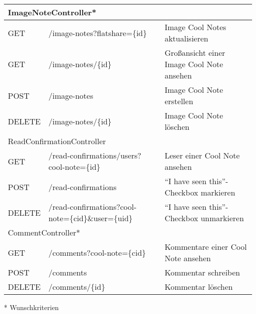 \documentclass[a4paper]{scrreprt}
\begin{document}
\begin{flushleft}
\begin{longtable}{|p{}|p{}|p{}|}
		\hline
		\multicolumn{3}{|l|}{ImageNoteController*} \\
		\hline
		GET & /image-notes?flatshare=\{id\} & Image Cool Notes aktualisieren \\
		GET & /image-notes/\{id\} & Großansicht einer Image Cool Note ansehen \\
		POST & /image-notes & Image Cool Note erstellen \\
		DELETE & /image-notes/\{id\} & Image Cool Note löschen \\
		\hline	
		\multicolumn{3}{|l|}{ReadConfirmationController} \\
		\hline
		GET & /read-confirmations/users?cool-note=\{id\} & Leser einer Cool Note ansehen \\
		POST & /read-confirmations & ``I have seen this''-Checkbox markieren \\
		DELETE & /read-confirmations?cool-note=\{cid\}\&user=\{uid\} & ``I have seen this''-Checkbox unmarkieren \\
		\hline
		\multicolumn{3}{|l|}{CommentController*} \\
		\hline
		GET & /comments?cool-note=\{cid\} & Kommentare einer Cool Note ansehen \\
		POST & /comments & Kommentar schreiben \\
		DELETE & /comments/\{id\} & Kommentar löschen \\
		\hline
		\end{longtable}
	\end{flushleft}
	* Wunschkriterien
	
	\newpage
\end{document}
